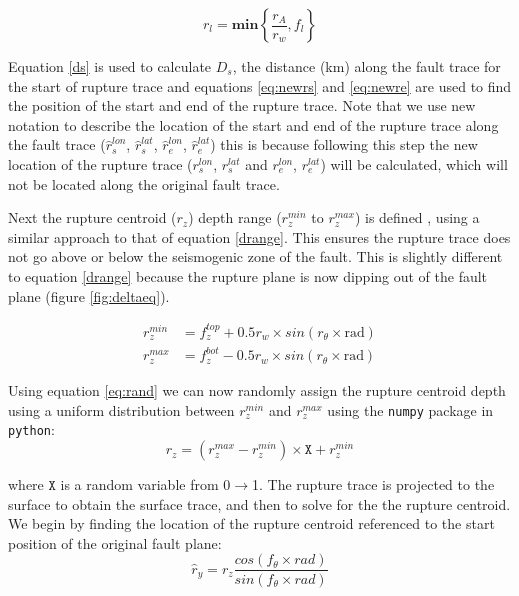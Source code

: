 \begin{equation}
r_l = \mathbf{min}\left\{\frac{r_A}{r_w}, f_l\right\}
\end{equation}

Equation \ref{ds} is used to calculate $D_s$, the distance (km) along the fault trace for the start of rupture trace and equations \ref{eq:newrs} and \ref{eq:newre} are used to find the position 
of the start and end of the rupture trace. Note that we use new notation to describe the location of the start and end of the rupture trace along the 
fault trace ($\hat{r}_s^{lon}$, $\hat{r}_s^{lat}$, $\hat{r}_e^{lon}$, $\hat{r}_e^{lat}$) this is because following this step the new location of the rupture 
trace ($r_s^{lon}$, $r_s^{lat}$ and $r_e^{lon}$, $r_e^{lat}$) will be calculated, which will not be located along the original fault trace. 



Next the rupture centroid ($r_z$) depth range ($r_z^{min}$ to $r_z^{max}$) is defined , using a similar approach to that of equation \ref{drange}. This ensures 
the rupture trace does not go above or below the seismogenic zone of the fault. This is slightly different to equation \ref{drange} because the rupture 
plane is now dipping out of the fault plane (figure \ref{fig:deltaeq}).

\begin{subequations} \label{drange2}
\begin{align}
r_z^{min} & = f_z^{top} + 0.5r_w  \times sin(r_\theta  \times \mbox{rad})    \\
r_z^{max} & = f_z^{bot} - 0.5r_w  \times sin(r_\theta  \times \mbox{rad})  
\end{align}
\end{subequations}

Using equation \ref{eq:rand} we can now randomly assign the rupture centroid depth using a uniform distribution between $r_z^{min}$ and $r_z^{max}$ using the \texttt{numpy} package in \texttt{python}:
\begin{equation}
r_z = ( r_z^{max}-r_z^{min} ) \times  \mathtt{X} +   r_z^{min}
\end{equation}

where $\mathtt{X}$ is a random variable from 0$\rightarrow$1. The rupture trace is projected to the surface to obtain the surface trace, and then to solve for the the rupture centroid. 
We begin by finding the location of the rupture centroid referenced to the start position of the original fault plane:
\begin{equation}\label{eq:ry}
\hat{r}_y = r_z  \frac{cos(f_\theta  \times rad)}{sin(f_\theta \times rad)}
\end{equation}

